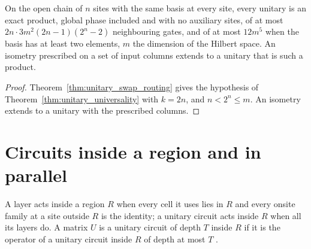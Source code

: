 \begin{theorem}
    \label{thm:unitary_chain_universality}
    \leanok
    On the open chain of $n$ sites with the same basis at every site, every unitary is an
    exact product, global phase included and with no auxiliary sites, of at most
    $2n\cdot3m^2(2n-1)(2^n-2)$ neighbouring gates, and of at most $12m^5$ when the basis has
    at least two elements, $m$ the dimension of the Hilbert space. An isometry prescribed on a
    set of input columns extends to a unitary that is such a product.
\end{theorem}
\begin{proof}\leanok
    Theorem~\ref{thm:unitary_swap_routing} gives the hypothesis of
    Theorem~\ref{thm:unitary_universality} with $k=2n$, and $n<2^n\le m$. An isometry extends to
    a unitary with the prescribed columns.
\end{proof}


\section{Circuits inside a region and in parallel}
\label{sec:unitary_region}

\begin{definition}
    \label{def:unitary_inside}
    \leanok
    A layer acts inside a region $R$ when every cell it uses lies in $R$ and every onsite
    family at a site outside $R$ is the identity; a unitary circuit acts inside $R$ when all
    its layers do. A matrix $U$ is a unitary circuit of depth $T$ inside $R$ if it is the
    operator of a unitary circuit inside $R$ of depth at most $T$
    \cite{Malz2024Preparation}.
\end{definition}

